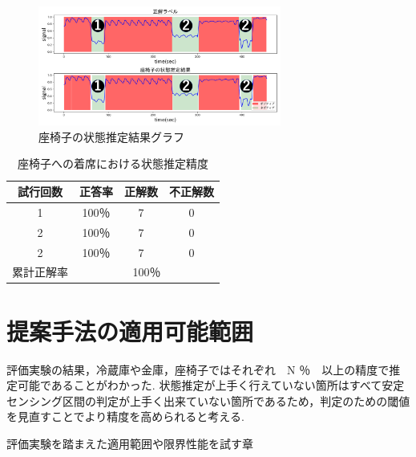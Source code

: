 \documentclass[Japanese]{dicomopapers}
\begin{document}
\begin{figure}[ht]
    \centering
    \includegraphics[width=8cm]{zaisu_graph.png}
    \caption{座椅子の状態推定結果グラフ}
    \label{chair_graph}
\end{figure}

\begin{table}[htb]
    \begin{center}
        \caption{座椅子への着席における状態推定精度}
        \label{chair_fig}
        \begin{tabular}{|c|c|c|c|} \hline
        試行回数 & 正答率 & 正解数 & 不正解数 \\ \hline
        1 & 100％ & 7 & 0 \\ \hline
        2 & 100％ & 7 & 0 \\ \hline
        2 & 100％ & 7 & 0 \\ \hline \hline
        累計正解率 & \multicolumn{3}{c|}{100％} \\ \hline
        \end{tabular}
    \end{center}
\end{table}






\section{提案手法の適用可能範囲}
評価実験の結果，冷蔵庫や金庫，座椅子ではそれぞれ　N ％　以上の精度で推定可能であることがわかった.
状態推定が上手く行えていない箇所はすべて安定センシング区間の判定が上手く出来ていない箇所であるため，判定のための閾値を見直すことでより精度を高められると考える.


評価実験を踏まえた適用範囲や限界性能を試す章



\end{document}
